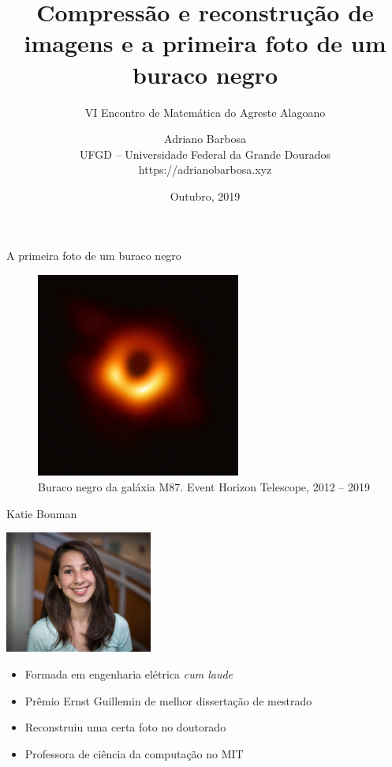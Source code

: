 \documentclass{beamer}
\author[Adriano Barbosa]{Adriano Barbosa\\
UFGD -- Universidade Federal da Grande Dourados\\
https://adrianobarbosa.xyz}
\title{Compress\~ao e reconstru\c{c}\~ao de imagens e a primeira foto de um buraco negro}
\subtitle[VI EMAAL]{VI Encontro de Matem\'atica do Agreste Alagoano}
\date{Outubro, 2019}
\begin{document}
\begin{frame}
	\maketitle
\end{frame}

\begin{frame}{A primeira foto de um buraco negro}
    \begin{figure}
        \centering
        \includegraphics[width=0.6\textwidth]{figs/buraco-negro.jpg}
        \caption{Buraco negro da gal\'axia M87. Event Horizon Telescope, 2012 -- 2019}
    \end{figure}
\end{frame}

\begin{frame}{Katie Bouman}
    \begin{center}
        \includegraphics[height=4cm]{figs/katie.jpg}
    \end{center}
    \begin{itemize}
        \item Formada em engenharia el\'etrica \textit{cum laude}
        \item Pr\^emio Ernst Guillemin de melhor disserta\c{c}\~ao de mestrado
        \item Reconstruiu uma certa foto no doutorado
        \item Professora de ci\^encia da computa\c{c}\~ao no MIT
    \end{itemize}
\end{frame}
\end{document}
